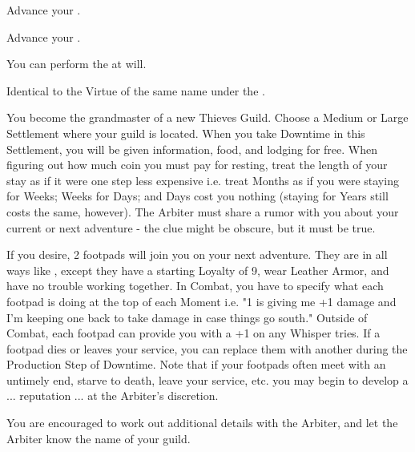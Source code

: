 \begin{multicols*}{2}


Advance your  \DCUP.


Advance your  \DCUP.


You can perform the  at will.


Identical to the Virtue of the same name under the . 

\cbreak


You become the grandmaster of a new Thieves Guild. Choose a Medium or Large Settlement where your guild is located. When you take Downtime in this Settlement, you will be given information, food, and lodging for free. When figuring out how much coin you must pay for resting, treat the length of your stay as if it were one step less expensive i.e. treat Months as if you were staying for Weeks; Weeks for Days; and Days cost you nothing (staying for Years still costs the same, however). The Arbiter must share a rumor with you about your current or next adventure - the clue might be obscure, but it must be true.

If you desire, 2 footpads will join you on your next adventure.  They are  in all ways like , except they have a starting Loyalty of 9, wear Leather Armor, and have no trouble working together. In Combat, you have to specify what each footpad is doing at the top of each Moment i.e. "1 is giving me +1 damage and I'm keeping one back to take damage in case things go south." Outside of Combat, each footpad can provide you with a +1 on any Whisper tries. If a footpad dies or leaves your service, you can replace them with another during the Production Step of Downtime. Note that if your footpads often meet with an untimely end, starve to death, leave your service, etc. you may begin to develop a ... reputation ... at the Arbiter's discretion.

You are encouraged to work out additional details with the Arbiter, and let the Arbiter know the name of your guild.



\end{multicols*}
